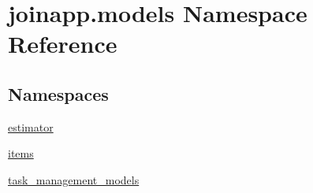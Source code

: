 \hypertarget{namespacejoinapp_1_1models}{}\section{joinapp.\+models Namespace Reference}
\label{namespacejoinapp_1_1models}
\subsection*{Namespaces}
\begin{DoxyCompactItemize}
\item 
 \mbox{\hyperlink{namespacejoinapp_1_1models_1_1estimator}{estimator}}
\item 
 \mbox{\hyperlink{namespacejoinapp_1_1models_1_1items}{items}}
\item 
 \mbox{\hyperlink{namespacejoinapp_1_1models_1_1task__management__models}{task\+\_\+management\+\_\+models}}
\end{DoxyCompactItemize}
